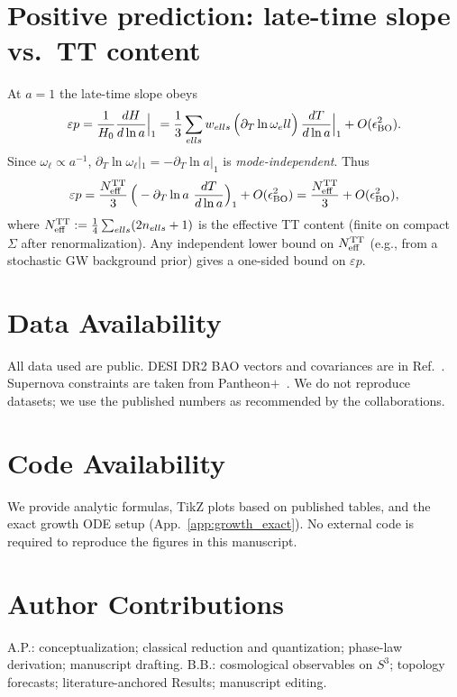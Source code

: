 \documentclass[aps,prd,twocolumn,amsmath,amssymb,nofootinbib,superscriptaddress]{revtex4-2}
\def\mathcal#1{#1}%
\begin{document}
\section{Positive prediction: late-time slope vs.\ TT content}
\label{sec:positive_pred}

At $a=1$ the late-time slope obeys
\begin{equation}
\varepsilon p
=\frac{1}{H_0}\frac{dH}{d\ln a}\Big|_{1}
=\frac{1}{3}\sum_{\ell s} w_{\ell s}\,\Big(\partial_T\ln\omega_\ell\Big)\,\frac{dT}{d\ln a}\Big|_{1}
+\mathcal O(\epsilon_{\rm BO}^2).
\end{equation}
Since $\omega_\ell\propto a^{-1}$, $\partial_T\ln\omega_\ell|_{1}=-\partial_T\ln a|_{1}$ is \emph{mode-independent}. Thus
\begin{equation}
\varepsilon p
=\frac{\mathcal N_{\rm eff}^{\rm TT}}{3}\,\Big(-\partial_T\ln a\ \frac{dT}{d\ln a}\Big)_{1}
+\mathcal O(\epsilon_{\rm BO}^2)
=\frac{\mathcal N_{\rm eff}^{\rm TT}}{3}+\mathcal O(\epsilon_{\rm BO}^2),
\end{equation}
where $\mathcal N_{\rm eff}^{\rm TT}:=\tfrac14\sum_{\ell s}(2n_{\ell s}+1)$ is the effective TT content (finite on compact $\Sigma$ after renormalization). Any independent lower bound on $\mathcal N_{\rm eff}^{\rm TT}$ (e.g., from a stochastic GW background prior) gives a one-sided bound on $\varepsilon p$.

\section*{Data Availability}
All data used are public. DESI DR2 BAO vectors and covariances are in Ref.~\cite{DESI_DR2_BAO}. Supernova constraints are taken from Pantheon$+$~\cite{PantheonPlusBrout}. We do not reproduce datasets; we use the published numbers as recommended by the collaborations.

\section*{Code Availability}
We provide analytic formulas, TikZ plots based on published tables, and the exact growth ODE setup (App.~\ref{app:growth_exact}). No external code is required to reproduce the figures in this manuscript.

\section*{Author Contributions}
A.P.: conceptualization; classical reduction and quantization; phase-law derivation; manuscript drafting. B.B.: cosmological observables on $S^3$; topology forecasts; literature-anchored Results; manuscript editing.
\end{document}
